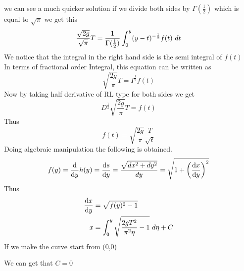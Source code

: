 we can see a much quicker solution if we divide both sides by $\Gamma(\frac{1}{2})$ which is equal to $\sqrt{\pi}$
we get this 
\[
    \frac{\sqrt{2g}}{\sqrt{\pi}} T = \frac{1}{\Gamma(\frac{1}{2})} \int_{0}^{y}(y-t)^{-\frac{1}{2}} f(t) \,\, dt
\]
We notice that the integral in the right hand side is the semi integral of $f(t)$
\\
In terms of fractional order Integral, this equation can be written as
\[
    \sqrt{\frac{2g}{\pi}} T = I^{\frac{1}{2}}f(t)
\]
Now by taking half derivative of RL type for both sides we get 
\[
    D^{\frac{1}{2}} \sqrt{\frac{2g}{\pi}} T = f(t)
\]
Thus 
\[
    f(t) = \sqrt{\frac{2g}{\pi}} \frac{T}{\sqrt{t}}
\]
Doing algebraic manipulation the following is obtained.
\[
    f(y) = \dv{}{y} h(y) = \dv{s}{y} = \frac{\sqrt{dx^2 + dy^2}}{dy} = \sqrt{1+ \left(\dv{x}{y}\right)^2}
\]
Thus
\begin{align*}
    \dv{x}{y} &= \sqrt{f(y)^2-1}
    \\
    x &= \int_{0}^{y} \sqrt{\frac{2g T^2}{\pi^2 \eta} - 1} \,\, d\eta + C
\end{align*}
If we make the curve start from (0,0)

\begin{center}
\end{center}

We can get that $C = 0$

